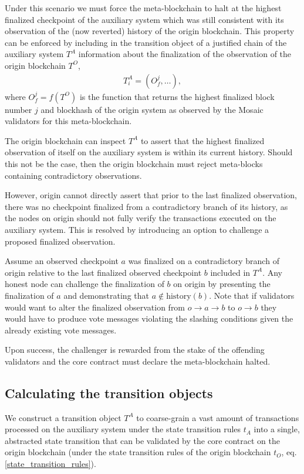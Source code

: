 \documentclass[12pt,a4paper]{article}
\begin{document}
Under this scenario we must force the meta-blockchain to halt at the highest finalized checkpoint of the auxiliary system which was still consistent with its observation of the (now reverted) history of the origin blockchain.
This property can be enforced by including in the transition object of a justified chain of the auxiliary system $T^A$ information about the finalization of the observation of the origin blockchain $T^O$,
\begin{align*}
  T^A_i = (O^j_f, \dots),
\end{align*}
where $O^j_f = f(T^O)$ is the function that returns the highest finalized block number $j$ and blockhash of the origin system as observed by the Mosaic validators for this meta-blockchain.

The origin blockchain can inspect $T^A$ to assert that the highest finalized observation of itself on the auxiliary system is within its current history.
Should this not be the case, then the origin blockchain must reject meta-blocks containing contradictory observations.

However, origin cannot directly assert that prior to the last finalized observation, there was no checkpoint finalized from a contradictory branch of its history, as the nodes on origin should not fully verify the transactions executed on the auxiliary system.
This is resolved by introducing an option to challenge a proposed finalized observation.

Assume an observed checkpoint $a$ was finalized on a contradictory branch of origin relative to the last finalized observed checkpoint $b$ included in $T^A$.
Any honest node can challenge the finalization of $b$ on origin by presenting the finalization of $a$ and demonstrating that $a \notin \text{history}(b)$.
Note that if validators would want to alter the finalized observation from $o \rightarrow a \rightarrow b$ to $o \rightarrow b$ they would have to produce vote messages violating the slashing conditions given the already existing vote messages.

Upon success, the challenger is rewarded from the stake of the offending validators and the core contract must declare the meta-blockchain halted.

\subsection{Calculating the transition objects}

We construct a transition object $T^A$ to coarse-grain a vast amount of transactions processed on the auxiliary system under the state transition rules $t_A$ into a single, abstracted state transition that can be validated by the core contract on the origin blockchain (under the state transition rules of the origin blockchain $t_O$, eq. \ref{state_transition_rules}).
\end{document}
